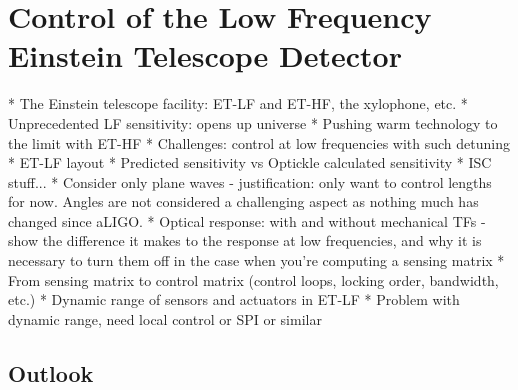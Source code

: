 \chapter{Control of the Low Frequency Einstein Telescope Detector}
\label{c:et-lf-control}

  * The Einstein telescope facility: ET-LF and ET-HF, the xylophone, etc.
    * Unprecedented LF sensitivity: opens up universe
    * Pushing warm technology to the limit with ET-HF
    * Challenges: control at low frequencies with such detuning
  * ET-LF layout
  * Predicted sensitivity vs Optickle calculated sensitivity
  * ISC stuff...
    * Consider only plane waves - justification: only want to control lengths for now. Angles are not considered a challenging aspect as nothing much has changed since aLIGO.
    * Optical response: with and without mechanical TFs - show the difference it makes to the response at low frequencies, and why it is necessary to turn them off in the case when you're computing a sensing matrix
    * From sensing matrix to control matrix (control loops, locking order, bandwidth, etc.)
    * Dynamic range of sensors and actuators in ET-LF
      * Problem with dynamic range, need local control or SPI or similar

\section{Outlook}